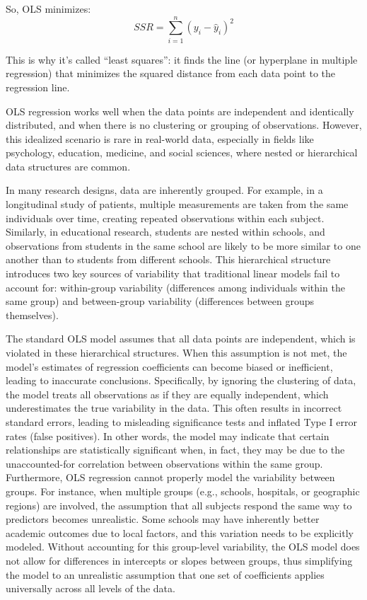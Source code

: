  So, OLS minimizes:
 \[
SSR=\sum_{i=1}^{n}(y_i - \hat{y}_i)^2
\]

This is why it's called ``least squares'': it finds the line (or hyperplane in multiple regression) that minimizes the squared distance from each data point to the regression line.

 OLS regression works well when the data points are independent and identically distributed, and when there is no clustering or grouping of observations. However, this idealized scenario is rare in real-world data, especially in fields like psychology, education, medicine, and social sciences, where nested or hierarchical data structures are common.

In many research designs, data are inherently grouped. For example, in a longitudinal study of patients, multiple measurements are taken from the same individuals over time, creating repeated observations within each subject. Similarly, in educational research, students are nested within schools, and observations from students in the same school are likely to be more similar to one another than to students from different schools. This hierarchical structure introduces two key sources of variability that traditional linear models fail to account for: within-group variability (differences among individuals within the same group) and between-group variability (differences between groups themselves).

The standard OLS model assumes that all data points are independent, which is violated in these hierarchical structures. When this assumption is not met, the model's estimates of regression coefficients can become biased or inefficient, leading to inaccurate conclusions. Specifically, by ignoring the clustering of data, the model treats all observations as if they are equally independent, which underestimates the true variability in the data. This often results in incorrect standard errors, leading to misleading significance tests and inflated Type I error rates (false positives). In other words, the model may indicate that certain relationships are statistically significant when, in fact, they may be due to the unaccounted-for correlation between observations within the same group.
Furthermore, OLS regression cannot properly model the variability between groups. For instance, when multiple groups (e.g., schools, hospitals, or geographic regions) are involved, the assumption that all subjects respond the same way to predictors becomes unrealistic. Some schools may have inherently better academic outcomes due to local factors, and this variation needs to be explicitly modeled. Without accounting for this group-level variability, the OLS model does not allow for differences in intercepts or slopes between groups, thus simplifying the model to an unrealistic assumption that one set of coefficients applies universally across all levels of the data.

